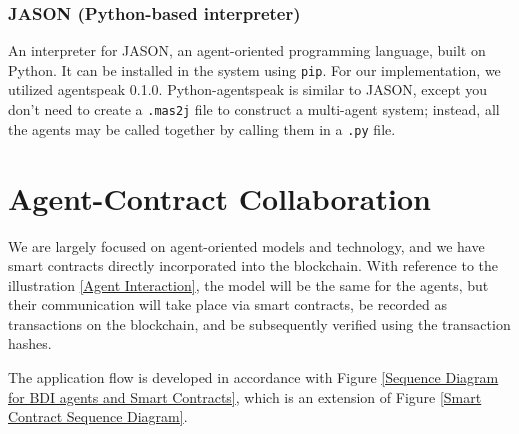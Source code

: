 \subsubsection{JASON (Python-based interpreter)}

An interpreter for JASON, an agent-oriented programming language, built on Python. It can be installed in the system using \texttt{\ac{pip}}. For our implementation, we utilized agentspeak 0.1.0. Python-agentspeak is similar to JASON, except you don't need to create a \texttt{.mas2j} file to construct a multi-agent system; instead, all the agents may be called together by calling them in a \texttt{.py} file.


\section{Agent-Contract Collaboration}

 
 We are largely focused on agent-oriented models and technology, and we have smart contracts directly incorporated into the blockchain. With reference to the illustration \ref{Agent Interaction}, the model will be the same for the agents, but their communication will take place via smart contracts, be recorded as transactions on the blockchain, and be subsequently verified using the transaction hashes.

 \vspace{.5cm}
The application flow is developed in accordance with Figure \ref{Sequence Diagram for BDI agents and Smart Contracts}, which is an extension of Figure \ref{Smart Contract Sequence Diagram}.

